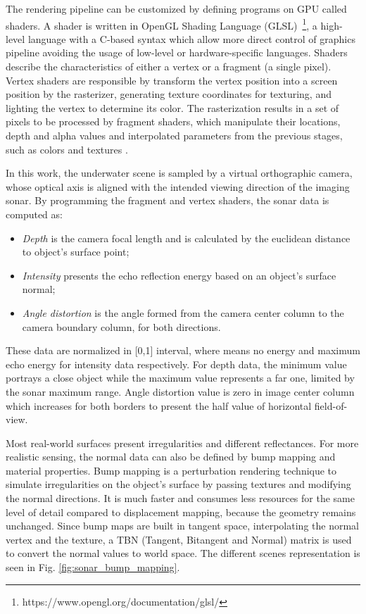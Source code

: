 \documentclass[final,5p,times]{elsarticle}
\begin{document}
The rendering pipeline can be customized by defining programs on GPU called shaders. A shader is written in OpenGL Shading Language (GLSL)~\footnote{https://www.opengl.org/documentation/glsl/}, a high-level language with a C-based syntax which allow more direct control of graphics pipeline avoiding the usage of low-level or hardware-specific languages. Shaders describe the characteristics of either a vertex or a fragment (a single pixel). Vertex shaders are responsible by transform the vertex position into a screen position by the rasterizer, generating texture coordinates for texturing, and lighting the vertex to determine its color. The rasterization results in a set of pixels to be processed by fragment shaders, which manipulate their locations, depth and alpha values and interpolated parameters from the previous stages, such as colors and textures \cite{fernando2003}.

In this work, the underwater scene is sampled by a virtual orthographic camera, whose optical axis is aligned with the intended viewing direction of the imaging sonar. By programming the fragment and vertex shaders, the sonar data is computed as:

\begin{itemize}[(a)]
    \item \textit{Depth} is the camera focal length and is calculated by the euclidean distance to object's surface point;
    \item \textit{Intensity} presents the echo reflection energy based on an object's surface normal;
    \item \textit{Angle distortion} is the angle formed from the camera center column to the camera boundary column, for both directions.
\end{itemize}

These data are normalized in [0,1] interval, where means no energy and maximum echo energy for intensity data respectively. For depth data, the minimum value portrays a close object while the maximum value represents a far one, limited by the sonar maximum range. Angle distortion value is zero in image center column which increases for both borders to present the half value of horizontal field-of-view.

Most real-world surfaces present irregularities and different reflectances. For more realistic sensing, the normal data can also be defined by bump mapping and material properties. Bump mapping is a perturbation rendering technique to simulate irregularities on the object's surface by passing textures and modifying the normal directions. It is much faster and consumes less resources for the same level of detail compared to displacement mapping, because the geometry remains unchanged. Since bump maps are built in tangent space, interpolating the normal vertex and the texture, a TBN (Tangent, Bitangent and Normal) matrix is used to convert the normal values to world space. The different scenes representation is seen in Fig. \ref{fig:sonar_bump_mapping}.
\end{document}

